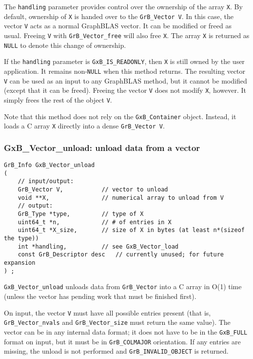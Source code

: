 The \verb'handling' parameter provides control over the ownership of the array
\verb'X'.  By default, ownership of \verb'X' is handed over to the
\verb'GrB_Vector V'.  In this case, the vector \verb'V' acts as a normal
GraphBLAS vector.  It can be modified or freed as usual.  Freeing \verb'V' with
\verb'GrB_Vector_free' will also free \verb'X'.  The array \verb'X' is returned
as \verb'NULL' to denote this change of ownership.

If the \verb'handling' parameter is \verb'GxB_IS_READONLY', then \verb'X' is
still owned by the user application.  It remains non-\verb'NULL' when this
method returns.  The resulting vector \verb'V' can be used as an input to any
GraphBLAS method, but it cannot be modified (except that it can be freed).
Freeing the vector \verb'V' does not modify \verb'X', however.  It simply
frees the rest of the object \verb'V'.

Note that this method does not rely on the \verb'GxB_Container' object.
Instead, it loads a C array \verb'X' directly into a dense \verb'GrB_Vector V'.

\subsubsection{{\sf GxB\_Vector\_unload:} unload data from a vector}
\label{vector_unload}

\begin{mdframed}[userdefinedwidth=6in]
{\footnotesize
\begin{verbatim}
GrB_Info GxB_Vector_unload
(
    // input/output:
    GrB_Vector V,           // vector to unload
    void **X,               // numerical array to unload from V
    // output:
    GrB_Type *type,         // type of X
    uint64_t *n,            // # of entries in X
    uint64_t *X_size,       // size of X in bytes (at least n*(sizeof the type))
    int *handling,          // see GxB_Vector_load
    const GrB_Descriptor desc   // currently unused; for future expansion
) ;
\end{verbatim}
} \end{mdframed}

\verb'GxB_Vector_unload' unloads data from \verb'GrB_Vector' into a C array in
O(1) time (unless the vector has pending work that must be finished first).

On input, the vector \verb'V' must have all possible entries present (that is,
\verb'GrB_Vector_nvals' and \verb'GrB_Vector_size' must return the same value).
The vector can be in any internal data format; it does not have to be in the
\verb'GxB_FULL' format on input, but it must be in \verb'GrB_COLMAJOR'
orientation.  If any entries are missing, the unload is not performed and
\verb'GrB_INVALID_OBJECT' is returned.

